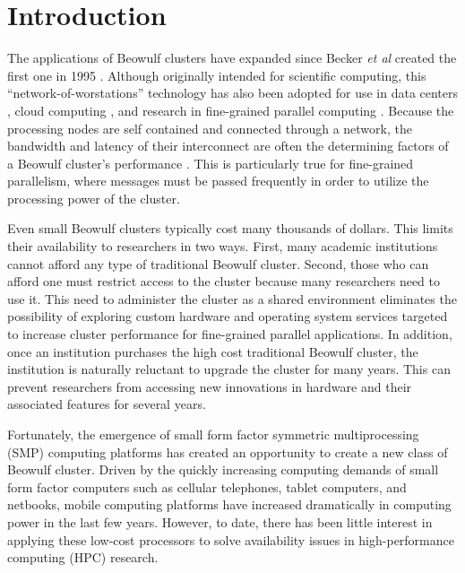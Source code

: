 \documentclass[11pt]{book}
\begin{document}
\clearpage
{}
\setcounter{page}{1}

\chapter{Introduction}\label{introduction}

The applications of Beowulf clusters have expanded since Becker \emph{et al} created the
first one in 1995 \cite{becker-95}.  Although originally intended for scientific
computing, this ``network-of-worstations'' technology has also been adopted for use in
data centers \cite{liu-13}, cloud computing \cite{trivedi-11}, and research in
fine-grained parallel computing \cite{aad-03}.  Because the processing nodes are self
contained and connected through a network, the bandwidth and latency of their interconnect
are often the determining factors of a Beowulf cluster's performance
\cite{becker-95,lancaster-10}.  This is particularly true for fine-grained parallelism,
where messages must be passed frequently in order to utilize the processing power of the
cluster.

Even small Beowulf clusters typically cost many thousands of dollars.  This limits their
availability to researchers in two ways.  First, many academic institutions cannot afford
any type of traditional Beowulf cluster.  Second, those who can afford one must restrict
access to the cluster because many researchers need to use it.  This need to administer
the cluster as a shared environment eliminates the possibility of exploring custom
hardware and operating system services targeted to increase cluster performance for
fine-grained parallel applications.  In addition, once an institution purchases the high
cost traditional Beowulf cluster, the institution is naturally reluctant to upgrade the
cluster for many years.  This can prevent researchers from accessing new innovations in
hardware and their associated features for several years.

Fortunately, the emergence of small form factor symmetric multiprocessing (SMP) computing
platforms has created an opportunity to create a new class of Beowulf cluster.  Driven by
the quickly increasing computing demands of small form factor computers such as cellular
telephones, tablet computers, and netbooks, mobile computing platforms have increased
dramatically in computing power in the last few years.  However, to date, there has been
little interest in applying these low-cost processors to solve availability issues in
high-performance computing (HPC) research.
\end{document}
